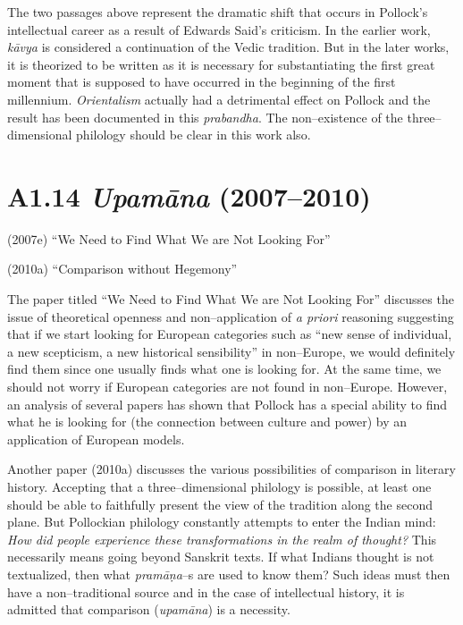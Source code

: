 {{{The two passages above represent the dramatic shift that occurs in Pollock’s intellectual career as a result of Edwards Said’s criticism. In the earlier work, \textit{kāvya }is considered a continuation of the Vedic tradition. But in the later works, it is theorized to be written as it is necessary for substantiating the first great moment that is supposed to have occurred in the beginning of the first millennium. \textit{Orientalism} actually had a detrimental effect on Pollock and the result has been documented in this \textit{prabandha}. The non–existence of the three–dimensional philology should be clear in this work also.

\vspace{-.5cm}

\section*{A1.14 {\it{\textbf{Upamāna}}} (2007–2010)}

\vspace{-.3cm}

(2007e) “We Need to Find What We are Not Looking For”

(2010a) “Comparison without Hegemony”

The paper titled “We Need to Find What We are Not Looking For” discusses the issue of theoretical openness and non–application of \textit{a priori} reasoning suggesting that if we start looking for European categories such as “new sense of individual, a new scepticism, a new historical sensibility” in non–Europe, we would definitely find them since one usually finds what one is looking for. At the same time, we should not worry if European categories are not found in non–Europe. However, an analysis of several papers has shown that Pollock has a special ability to find what he is looking for (the connection between culture and power) by an application of European models.

Another paper (2010a) discusses the various possibilities of comparison in literary history. Accepting that a three–dimensional philology is possible, at least one should be able to faithfully present the view of the tradition along the second plane. But Pollockian philology constantly attempts to enter the Indian mind:\textit{ How did people experience these transformations in the realm of thought?} This necessarily means going beyond Sanskrit texts. If what Indians thought is not textualized, then what \textit{pramāṇa}–s are used to know them? Such ideas must then have a non–traditional source and in the case of intellectual history, it is admitted that comparison (\textit{upamāna}) is a necessity.

}}}
